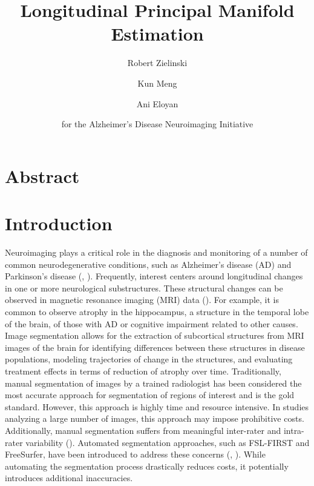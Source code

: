 \documentclass[11pt,reqno]{article}
\theoremstyle{definition}
\begin{document}
\title{Longitudinal Principal Manifold Estimation}
\author[1]{Robert Zielinski}
\author[2]{Kun Meng}
\author[1]{Ani Eloyan}
\author[*]{for the Alzheimer’s Disease Neuroimaging Initiative}



\maketitle

\doublespacing

\section*{Abstract}

\section{Introduction}

Neuroimaging plays a critical role in the diagnosis and monitoring of a number of common neurodegenerative conditions, such as Alzheimer's disease (AD) and Parkinson's disease (\cite{knopmanAlzheimerDisease2021}, \cite{poeweParkinsonDisease2017}). Frequently, interest centers around longitudinal changes in one or more neurological substructures. These structural changes can be observed in magnetic resonance imaging (MRI) data (\cite{crainiceanu2016tutorial}). For example, it is common to observe atrophy in the hippocampus, a structure in the temporal lobe of the brain, of those with AD or cognitive impairment related to other causes. Image segmentation allows for the extraction of subcortical structures from MRI images of the brain for identifying differences between these structures in disease populations, modeling trajectories of change in the structures, and evaluating treatment effects in terms of reduction of atrophy over time. Traditionally, manual segmentation of images by a trained radiologist has been considered the most accurate approach for segmentation of regions of interest and is the gold standard. However, this approach is highly time and resource intensive. In studies analyzing a large number of images, this approach may impose prohibitive costs. Additionally, manual segmentation suffers from meaningful inter-rater and intra-rater variability (\cite{boccardiSurveyProtocolsManual2011}). Automated segmentation approaches, such as FSL-FIRST and FreeSurfer, have been introduced to address these concerns (\cite{patenaudeBayesianModelShape2011}, \cite{reuterWithinsubjectTemplateEstimation2012}). While automating the segmentation process drastically reduces costs, it potentially introduces additional inaccuracies.
\end{document}
